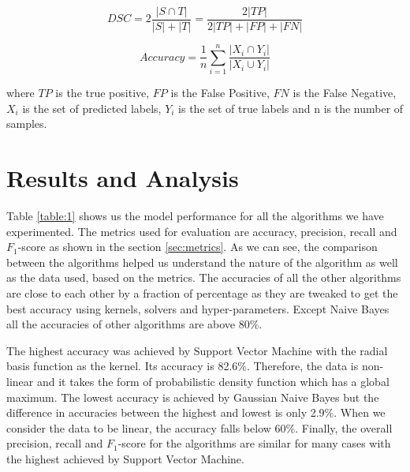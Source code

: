 \documentclass[conference]{IEEEtran}
\begin{document}
\begin{equation}
DSC = 2\frac{|S \cap T|}{|S| + |T|} = \frac{2|TP|}{2|TP| + |FP| + |FN|}
\end{equation}

\begin{equation}
Accuracy = \frac{1}{n}\sum\limits_{i=1}^{n} \frac{|X_i \cap Y_i|}{|X_i \cup Y_i|}
\end{equation}

where $TP$ is the true positive, $FP$ is the False Positive, $FN$ is the False Negative, $X_i$ is the set of predicted labels, $Y_i$ is the set of true labels and n is the number of samples.

\section{Results and Analysis}
Table \ref{table:1} shows us the model performance for all the algorithms we have experimented. The metrics used for evaluation are accuracy, precision, recall and $F_1$-score as shown in the section \ref{sec:metrics}. As we can see, the comparison between the algorithms helped us understand the nature of the algorithm as well as the data used, based on the metrics. The accuracies of all the other algorithms are close to each other by a fraction of percentage as they are tweaked to get the best accuracy using kernels, solvers and hyper-parameters. Except Naive Bayes all the accuracies of other algorithms are above 80\%. 
\par
The highest accuracy was achieved by Support Vector Machine with the radial basis function as the kernel. Its accuracy is 82.6\%. Therefore, the data is non-linear and it takes the form of probabilistic density function which has a global maximum. The lowest accuracy is achieved by Gaussian Naive Bayes but the difference in accuracies between the highest and lowest is only 2.9\%. When we consider the data to be linear, the accuracy falls below 60\%. Finally, the overall precision, recall and $F_1$-score for the algorithms are similar for many cases with the highest achieved by Support Vector Machine.
\par
\end{document}
